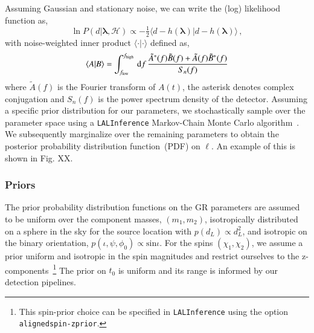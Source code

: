\documentclass[twocolumn,prd,aps,superscriptaddress,preprintnumbers,tightenlines,showpacs,nofootinbib,amsfonts,amsmath,longbibliography]{revtex4-1}
\newcommand{\dd}{{\rm d}}
\begin{document}

Assuming Gaussian and stationary noise, we can write the (log) likelihood function as,
%
\begin{equation}
\ln P(d \vert \bm{\lambda},\mathcal{H}) \propto
- \tfrac{1}{2}
\langle
d - h(\bm{\lambda}) \vert d - h(\bm{\lambda})
\rangle\,,
\end{equation}
%
with noise-weighted inner product $\langle \cdot | \cdot \rangle$ defined as,
%
\begin{equation}
\langle A | B \rangle =
\int_{f_{\rm low}}^{f_{\rm high}} \, \dd f \,
\frac{\tilde{A}^{\ast}(f) \tilde{B}(f) + \tilde{A}(f) \tilde{B}^{\ast}(f)}{S_{n}(f)}
\end{equation}
%
where $\tilde{A}(f)$ is the Fourier transform of $A(t)$, the asterisk denotes
complex conjugation and $S_{n}(f)$ is the power spectrum density of the
detector.
%
Assuming a specific prior distribution for our parameters, we stochastically
sample over the parameter space using a \texttt{LALInference} Markov-Chain
Monte Carlo algorithm~\cite{lalsuite}.
%
We subsequently marginalize over the remaining parameters to obtain the
posterior probability distribution function~(PDF) on $\ell$.
%
An example of this is shown in Fig. XX.

\subsubsection{Priors}

The prior probability distribution functions on the GR parameters are assumed to be uniform over the component masses, $(m_1, m_2)$, isotropically distributed on a sphere in the sky for the source location with $p(d_L) \propto d_L^2$, and isotropic on the binary orientation, $p(\iota, \psi, \phi_0) \propto \text{sin} \iota$. For the spins $(\chi_1, \chi_2)$, we assume a prior uniform and isotropic in the spin magnitudes and restrict ourselves to the z-components~\footnote{This spin-prior choice can be specified in \texttt{LALInference} using the option \texttt{alignedspin-zprior}.} The prior on $t_0$ is uniform and its range is informed by our detection pipelines.
\end{document}
